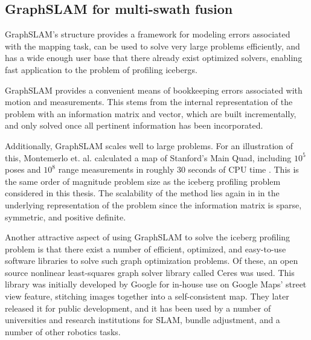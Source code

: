\subsection{GraphSLAM for multi-swath fusion}
\label{sec.GraphSLAMmotivation}
GraphSLAM's structure provides a framework for modeling errors associated with the mapping task, can be used to solve very large problems efficiently, and has a wide enough user base that there already exist optimized solvers, enabling fast application to the problem of profiling icebergs.


GraphSLAM provides a convenient means of bookkeeping errors associated with motion and measurements. This stems from the internal representation of the problem with an information matrix and vector, which are built incrementally, and only solved once all pertinent information has been incorporated. 


Additionally, GraphSLAM scales well to large problems. For an illustration of this, Montemerlo et. al. calculated a map of Stanford's Main Quad, including $10^5$ poses and $10^8$ range measurements in roughly 30 seconds of CPU time \cite{Thrun2005}. This is the same order of magnitude problem size as the iceberg profiling problem considered in this thesis. The scalability of the method lies again in in the underlying representation of the problem since the information matrix is sparse, symmetric, and positive definite.

Another attractive aspect of using GraphSLAM to solve the iceberg profiling problem is that there exist a number of efficient, optimized, and easy-to-use software libraries to solve such graph optimization problems. Of these, an open source nonlinear least-squares graph solver library called Ceres was used. This library was initially developed by Google for in-house use on Google Maps' street view feature, stitching images together into a self-consistent map. They later released it for public development, and it has been used by a number of universities and research institutions for SLAM, bundle adjustment, and a number of other robotics tasks. \cite{Agarwal2012}

